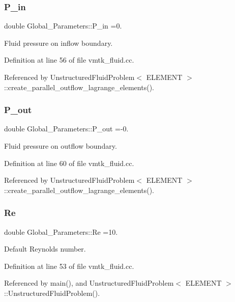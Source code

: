 \subsubsection{\texorpdfstring{P\+\_\+in}{P\_in}}
{\footnotesize\ttfamily double Global\+\_\+\+Parameters\+::\+P\+\_\+in =0.}



Fluid pressure on inflow boundary. 



Definition at line 56 of file vmtk\+\_\+fluid.\+cc.



Referenced by Unstructured\+Fluid\+Problem$<$ E\+L\+E\+M\+E\+N\+T $>$\+::create\+\_\+parallel\+\_\+outflow\+\_\+lagrange\+\_\+elements().

\mbox{\label{namespaceGlobal__Parameters_ac680ed856897793d54c9c867da19169c}} 
\subsubsection{\texorpdfstring{P\+\_\+out}{P\_out}}
{\footnotesize\ttfamily double Global\+\_\+\+Parameters\+::\+P\+\_\+out =-\/0.}



Fluid pressure on outflow boundary. 



Definition at line 60 of file vmtk\+\_\+fluid.\+cc.



Referenced by Unstructured\+Fluid\+Problem$<$ E\+L\+E\+M\+E\+N\+T $>$\+::create\+\_\+parallel\+\_\+outflow\+\_\+lagrange\+\_\+elements().

\mbox{\label{namespaceGlobal__Parameters_a9d72e94a9305c6a310940a6a427ebe06}} 
\subsubsection{\texorpdfstring{Re}{Re}}
{\footnotesize\ttfamily double Global\+\_\+\+Parameters\+::\+Re =10.}



Default Reynolds number. 



Definition at line 53 of file vmtk\+\_\+fluid.\+cc.



Referenced by main(), and Unstructured\+Fluid\+Problem$<$ E\+L\+E\+M\+E\+N\+T $>$\+::\+Unstructured\+Fluid\+Problem().

